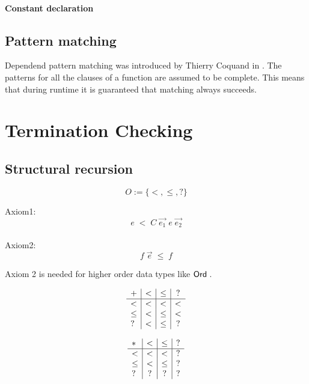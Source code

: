 \subsubsection{Constant declaration}

\section{Pattern matching}
Dependend pattern matching was introduced by Thierry Coquand in \cite{coquand92pattern}.
The patterns for all the clauses of a function are assumed to be complete. This means that during runtime
it is guaranteed that matching always succeeds.

\chapter{Termination Checking}

\newcommand{\order}{\mathrm{Order}}
\section{Structural recursion}

\begin{definition}[Order]
\[ O := \{ < , \leq , ? \} \]
\end{definition}
Axiom1:
\[ e \; < \; C \; \vec{e_1} \; e \; \vec{e_2} \]
\\
Axiom2:
\[ f \; \vec{e} \; \leq \; f \] 

Axiom 2 is needed for higher order data types like $\mathsf{Ord}\;$.

\begin{definition}
\[
\begin{array}{l | c |c | c }

 +    &  <   &  \leq   &  ? \\
 \hline 
 <    &  <   & <       &  < \\
 \leq &  <   & \leq    &  <  \\
 ?    &  <   & \leq    &  ?
\end{array}
\]

\end{definition}


\begin{definition}
\[
\begin{array}{l | c |c | c}
 *   &  <  &  \leq & ? \\
\hline
  <   & <    & <    &   ? \\
 \leq & <    & \leq &   ?  \\
 ?    & ?    & ?    &   ?
\end{array}
\]
\end{definition}

